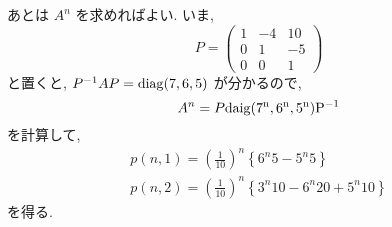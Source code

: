 \documentclass[main]{subfiles}
\begin{document}
\begin{pf}
あとは $A^n$ を求めればよい.
いま, 
\begin{equation*}
P = 
\begin{pmatrix}
1 & -4 & 10\\
0 & 1 & -5\\
0 & 0 & 1
\end{pmatrix}
\end{equation*}
と置くと, $P^{-1}AP=\rm{diag}(7,6,5)$ が分かるので, 
\begin{equation*}
A^n = P \rm{daig}(7^n,6^n,5^n) P^{-1}
\end{equation*}
を計算して,
\begin{eqnarray*}
p(n,1) = \left(\frac{1}{10}\right)^n \left\{ 6^n5 -5^n5 \right\} \\
p(n,2) = \left(\frac{1}{10}\right)^n \left\{ 3^n10 -6^n20 + 5^n10 \right\}
\end{eqnarray*}
を得る.
\end{pf}
\end{document}
